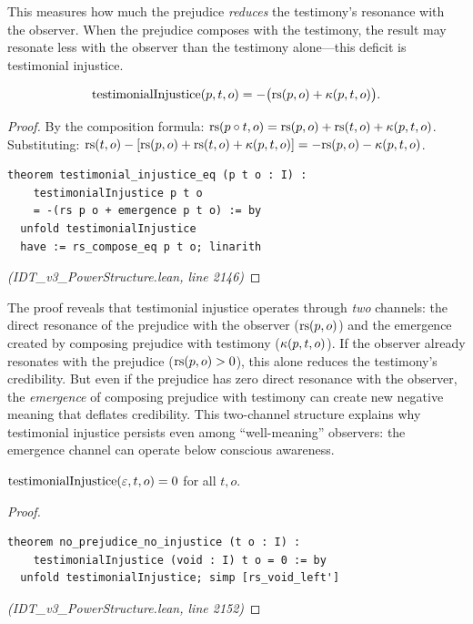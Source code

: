 This measures how much the prejudice \emph{reduces} the testimony's resonance
with the observer. When the prejudice composes with the testimony, the result
may resonate less with the observer than the testimony alone---this deficit
is testimonial injustice.

\begin{theorem}
\label{thm:testimonial-decomp}
\[
  \mathrm{testimonialInjustice}(p, t, o) = -\big(\mathrm{rs}(p, o) + \kappa(p, t, o)\big).
\]
\end{theorem}

\begin{proof}
By the composition formula:
$\mathrm{rs}(p \circ t, o) = \mathrm{rs}(p, o) + \mathrm{rs}(t, o) + \kappa(p, t, o)$.
Substituting: $\mathrm{rs}(t, o) - [\mathrm{rs}(p, o) + \mathrm{rs}(t, o) + \kappa(p, t, o)]
= -\mathrm{rs}(p, o) - \kappa(p, t, o)$.
\begin{lstlisting}
theorem testimonial_injustice_eq (p t o : I) :
    testimonialInjustice p t o
    = -(rs p o + emergence p t o) := by
  unfold testimonialInjustice
  have := rs_compose_eq p t o; linarith
\end{lstlisting}
\textit{(IDT\_v3\_PowerStructure.lean, line 2146)}
\end{proof}

\begin{remark}
The proof reveals that testimonial injustice operates through \emph{two}
channels: the direct resonance of the prejudice with the observer ($\mathrm{rs}(p,o)$)
and the emergence created by composing prejudice with testimony
($\kappa(p,t,o)$). If the observer already resonates with the prejudice
($\mathrm{rs}(p,o) > 0$), this alone reduces the testimony's credibility. But even
if the prejudice has zero direct resonance with the observer, the
\emph{emergence} of composing prejudice with testimony can create new negative
meaning that deflates credibility. This two-channel structure explains why
testimonial injustice persists even among ``well-meaning'' observers:
the emergence channel can operate below conscious awareness.
\end{remark}

\begin{theorem}
\label{thm:no-prejudice}
$\mathrm{testimonialInjustice}(\varepsilon, t, o) = 0$ for all $t, o$.
\end{theorem}

\begin{proof}
\begin{lstlisting}
theorem no_prejudice_no_injustice (t o : I) :
    testimonialInjustice (void : I) t o = 0 := by
  unfold testimonialInjustice; simp [rs_void_left']
\end{lstlisting}
\textit{(IDT\_v3\_PowerStructure.lean, line 2152)}
\end{proof}

